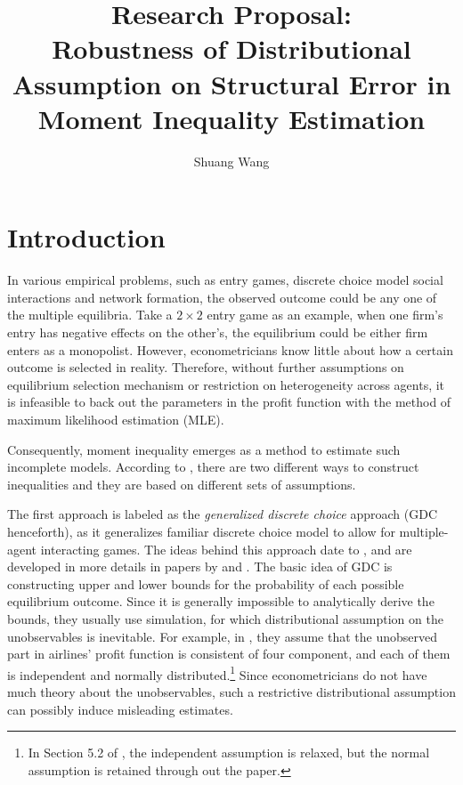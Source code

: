\documentclass[a4paper]{article}
\title{Research Proposal:\\
Robustness of Distributional Assumption on Structural Error in Moment Inequality Estimation}
\author{Shuang Wang}
\begin{document}
\maketitle


\section{Introduction}


In various empirical problems, such as entry games, discrete choice model social interactions and network formation, the observed outcome could be any one of the multiple equilibria. Take a $2\times2$ entry game as an example, when one firm's entry has negative effects on the other's, the equilibrium could be either firm enters as a monopolist. However, econometricians know little about how a certain outcome is selected in reality. Therefore, without further assumptions on equilibrium selection mechanism or restriction on heterogeneity across agents, it is infeasible to back out the parameters in the profit function with the method of maximum likelihood estimation (MLE).

Consequently, moment inequality emerges as a method to estimate such incomplete models. According to \cite{pakes2010alternative}, there are two different ways to construct inequalities and they are based on different sets of assumptions. 

The first approach is labeled as the \textit{generalized discrete choice} approach (GDC henceforth), as it generalizes familiar discrete choice model to allow for multiple-agent interacting games. The ideas behind this approach date to \cite{tamer2003incomplete}, and are developed in more details in papers by \cite{ciliberto2009market} and \cite{andrews2004confidence}. The basic idea of GDC is constructing upper and lower bounds for the probability of each possible equilibrium outcome. Since it is generally impossible to analytically derive the bounds, they usually use simulation, for which distributional assumption on the unobservables is inevitable. For example, in \cite{ciliberto2009market}, they assume that the unobserved part in airlines' profit function is consistent of four component, and each of them is independent and normally distributed.\footnote{In Section 5.2 of \cite{ciliberto2009market}, the independent assumption is relaxed, but the normal assumption is retained through out the paper.} Since econometricians do not have much theory about the unobservables, such a restrictive distributional assumption can possibly induce misleading estimates. 
\end{document}
